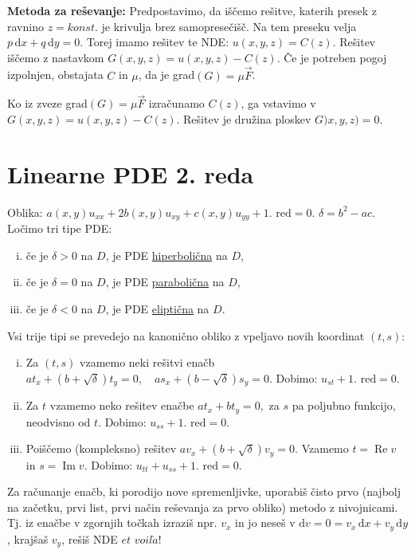 \documentclass[8pt,a4paper]{amsart}
\theoremstyle{definition} %
\theoremstyle{plain} %
\newcommand{\dx}{\ensuremath{\,\mathrm{d}x}}
\newcommand{\dy}{\ensuremath{\,\mathrm{d}y}}
\begin{document}
\textbf{Metoda za reševanje:} Predpostavimo, da iščemo rešitve, katerih presek z
ravnino $z = konst.$ je krivulja brez samopresečišč. Na tem preseku velja $p\dx
+ q \dy=0$. Torej imamo rešitev te NDE: $u(x,y,z) = C(z).$ Rešitev iščemo z
nastavkom $G(x,y,z) = u(x,y,z) - C(z)$. Če je potreben pogoj izpolnjen,
obstajata $C$ in $\mu$, da je grad$(G) = \mu \vec{F}$.

Ko iz zveze grad$(G) = \mu \vec{F}$ izračunamo $C(z)$, ga vstavimo v $G(x,y,z) =
u(x,y,z) - C(z)$. Rešitev je družina ploskev $G)x,y,z) = 0$.


\section*{Linearne PDE 2. reda}

Oblika: $a(x,y)u_{xx} + 2b(x,y)u_{xy} + c(x,y)u_{yy} + 1. \text{ red} = 0$.
$\delta = b^2 -ac$. Ločimo tri tipe PDE:

\begin{enumerate}[(i)]
  \item če je $\delta > 0 $ na $D$, je PDE \underline{hiperbolična} na $D$,
  \item če je $\delta = 0 $ na $D$, je PDE \underline{parabolična} na $D$,
  \item če je $\delta < 0 $ na $D$, je PDE \underline{eliptična} na $D$.
\end{enumerate}

Vsi trije tipi se prevedejo na kanonično obliko z vpeljavo novih koordinat
$(t,s)$:

\begin{enumerate}[(i)]
  \item Za $(t,s)$ vzamemo neki rešitvi enačb $ at_x + (b+\sqrt{\delta})t_y=0,
    \quad as_x + (b-\sqrt{\delta})s_y =0.$ Dobimo: $u_{st} + 1. \text{ red} = 0.$
  \item Za $t$ vzamemo neko rešitev enačbe $ at_x + bt_y = 0, $ za $s$ pa poljubno
    funkcijo, neodvisno od $t$. Dobimo: $u_{ss}+ 1. \text{ red}=0$.
  \item Poiščemo (kompleksno) rešitev $av_x + (b+\sqrt{\delta})v_y = 0$. Vzamemo
    $t = \operatorname{Re}v$ in $s = \operatorname{Im}v$. Dobimo: $u_{tt}+u_{ss}+
    1. \text{ red}=0$.
\end{enumerate} Za računanje enačb, ki porodijo nove spremenljivke, uporabiš
čisto prvo (najbolj na začetku, prvi list, prvi način reševanja za prvo obliko)
metodo z nivojnicami. Tj. iz enačbe v zgornjih točkah izraziš npr. $v_x$ in jo
neseš v $\text{d}v = 0 = v_x\dx + v_y \dy$, krajšaš $v_y$, rešiš NDE $et$
$voil\grave{a}$!
\end{document}
